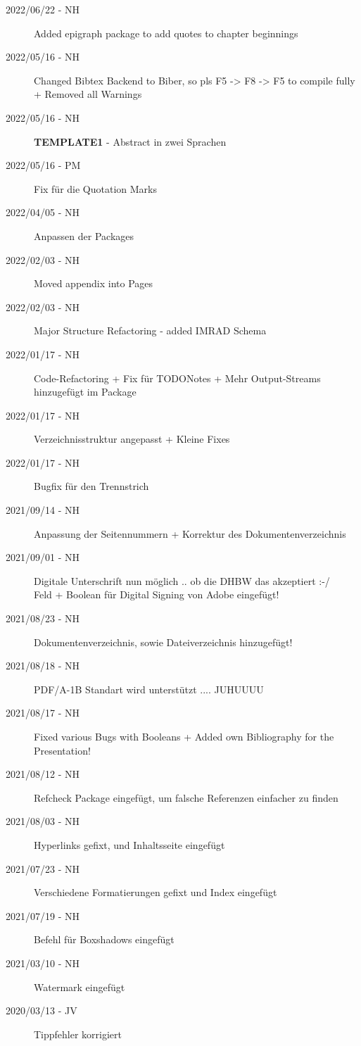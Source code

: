 \begin{description}
	\item[2022/06/22 - NH] Added epigraph package to add quotes to chapter beginnings
	\item[2022/05/16 - NH] Changed Bibtex Backend to Biber, so pls F5 -> F8 -> F5 to compile fully + Removed all Warnings
	\item[2022/05/16 - NH] \textbf{TEMPLATE1} - Abstract in zwei Sprachen 
	\item[2022/05/16 - PM] Fix für die Quotation Marks
	\item[2022/04/05 - NH] Anpassen der Packages 
	\item[2022/02/03 - NH] Moved appendix into Pages
	\item[2022/02/03 - NH] Major Structure Refactoring - added IMRAD Schema
	\item[2022/01/17 - NH] Code-Refactoring + Fix für TODONotes + Mehr Output-Streams hinzugefügt im 
							Package
	\item[2022/01/17 - NH] Verzeichnisstruktur angepasst + Kleine Fixes
	\item[2022/01/17 - NH] Bugfix für den Trennstrich
	\item[2021/09/14 - NH] Anpassung der Seitennummern + Korrektur des Dokumentenverzeichnis
	\item[2021/09/01 - NH] Digitale Unterschrift nun möglich .. ob die DHBW das akzeptiert :-/ \\
						   Feld + Boolean für Digital Signing von Adobe eingefügt!
	\item[2021/08/23 - NH] Dokumentenverzeichnis, sowie Dateiverzeichnis hinzugefügt!
	\item[2021/08/18 - NH] PDF/A-1B Standart wird unterstützt .... JUHUUUU
	\item[2021/08/17 - NH] Fixed various Bugs with Booleans + Added own Bibliography for the Presentation!
	\item[2021/08/12 - NH] Refcheck Package eingefügt, um falsche Referenzen einfacher zu finden
	\item[2021/08/03 - NH] Hyperlinks gefixt, und Inhaltsseite eingefügt
	\item[2021/07/23 - NH] Verschiedene Formatierungen gefixt und Index eingefügt
	\item[2021/07/19 - NH] Befehl für Boxshadows eingefügt
	\item[2021/03/10 - NH] Watermark eingefügt
	\item[2020/03/13 - JV] Tippfehler korrigiert\\

\end{description}

